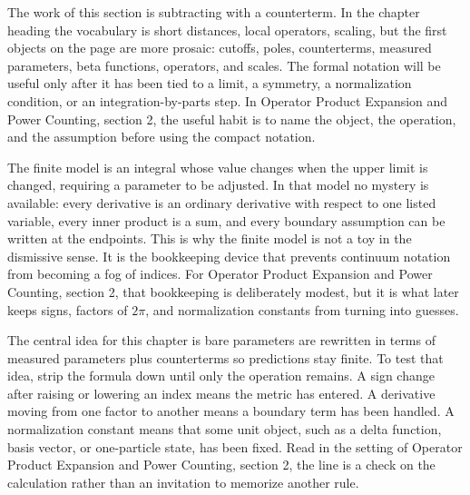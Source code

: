 











The work of this section is subtracting with a counterterm.  In the chapter heading the vocabulary is short distances, local operators, scaling, but the first objects on the page are more prosaic: cutoffs, poles, counterterms, measured parameters, beta functions, operators, and scales.  The formal notation will be useful only after it has been tied to a limit, a symmetry, a normalization condition, or an integration-by-parts step.  In Operator Product Expansion and Power Counting, section 2, the useful habit is to name the object, the operation, and the assumption before using the compact notation.

The finite model is an integral whose value changes when the upper limit is changed, requiring a parameter to be adjusted.  In that model no mystery is available: every derivative is an ordinary derivative with respect to one listed variable, every inner product is a sum, and every boundary assumption can be written at the endpoints.  This is why the finite model is not a toy in the dismissive sense.  It is the bookkeeping device that prevents continuum notation from becoming a fog of indices.  For Operator Product Expansion and Power Counting, section 2, that bookkeeping is deliberately modest, but it is what later keeps signs, factors of \(2\pi\), and normalization constants from turning into guesses.

The central idea for this chapter is bare parameters are rewritten in terms of measured parameters plus counterterms so predictions stay finite.  To test that idea, strip the formula down until only the operation remains.  A sign change after raising or lowering an index means the metric has entered.  A derivative moving from one factor to another means a boundary term has been handled.  A normalization constant means that some unit object, such as a delta function, basis vector, or one-particle state, has been fixed.  Read in the setting of Operator Product Expansion and Power Counting, section 2, the line is a check on the calculation rather than an invitation to memorize another rule.


